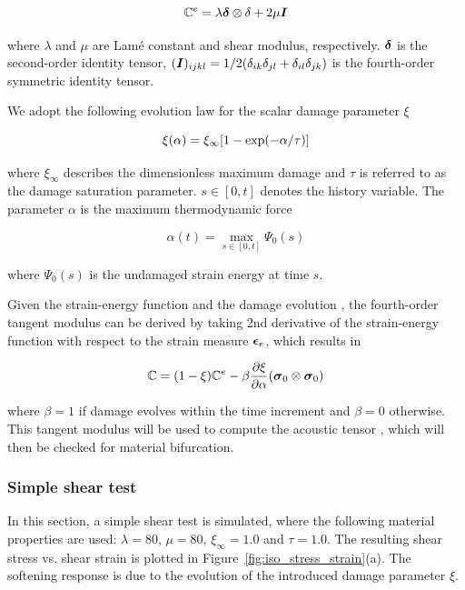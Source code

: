 \documentclass[12pt]{article}
\numberwithin{equation}{section}
\begin{document}
\begin{equation}
  \mathbb{C}^e = \lambda {\boldsymbol{\delta}}\otimes\delta + 2\mu{\boldsymbol{I}}
\end{equation}

where $\lambda$ and $\mu$ are Lam\'{e} constant and shear modulus,
respectively. ${\boldsymbol{\delta}}$ is the second-order identity tensor,
$({\boldsymbol{I}})_{ijkl} = 1/2(\delta_{ik}\delta_{jl} +
\delta_{il}\delta_{jk})$ is the fourth-order symmetric identity
tensor.

We adopt the following evolution law for the scalar damage parameter $
\xi$ \cite{Holzapfel:2000}

\begin{equation}\label{eq:iso_xi}
  \xi(\alpha) = \xi_{\infty} [ 1- {\rm exp}(-\alpha / \tau)]
\end{equation}

where $\xi_{\infty}$ describes the dimensionless maximum damage and
$\tau$ is referred to as the damage saturation parameter. $s \in
[0,t]$ denotes the history variable. The parameter $\alpha$ is the
maximum thermodynamic force \cite{Holzapfel:2000}

\begin{equation}
  \alpha(t) = \max_{s\in [0,t]}\Psi_0(s)
\end{equation}

where $\Psi_0(s)$ is the undamaged strain energy at time $s$.

Given the strain-energy function  and the damage
evolution , the fourth-order tangent modulus can be
derived by taking 2nd derivative of the strain-energy function with
respect to the strain measure ${\boldsymbol{\epsilon}}_e$, which results in

\begin{equation}
  \mathbb{C} = (1-\xi)\mathbb{C}^e 
    - \beta \frac{\partial\xi}{\partial\alpha}
    ({\boldsymbol{\sigma}}_0\otimes{\boldsymbol{\sigma}}_0)
\end{equation}

where $\beta = 1$ if damage evolves within the time increment and 
$\beta=0$ otherwise. This tangent modulus will be used to compute the 
acoustic tensor , which will then be checked 
for material bifurcation.

\subsubsection{Simple shear test}

In this section, a simple shear test is simulated, where the following 
material properties are used: $\lambda = 80$, $\mu = 80$, 
$\xi_{\infty} = 1.0$ and $\tau = 1.0$. The resulting shear stress vs. 
shear strain is plotted in Figure~\ref{fig:iso_stress_strain}(a). The 
softening response is due to the evolution of the introduced damage 
parameter $\xi$. 
\end{document}
